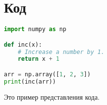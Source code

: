\section{Код}

\begin{lstlisting}[language=Python]
import numpy as np

def inc(x):
    # Increase a number by 1.
    return x + 1

arr = np.array([1, 2, 3])
print(inc(arr))
\end{lstlisting}

Это пример представления кода.

